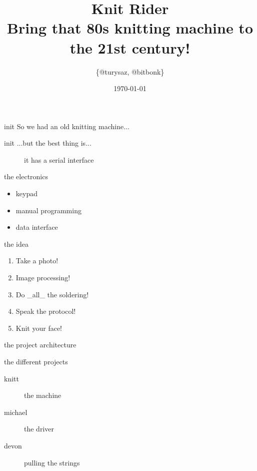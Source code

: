\documentclass{beamer}
\author{\{@turysaz, @bitbonk\}}
\title{\Huge{Knit Rider}\\
    \large{Bring that 80s knitting machine to the 21st century!}
}
\date{\today{}}
\begin{document}
\maketitle

\begin{frame}{init}
      So we had an old knitting machine...
\end{frame}


\begin{frame}{init}
    ...but the best thing is...\pause
    \begin{figure}
        \caption{it has a serial interface}
    \end{figure}
\end{frame}

\begin{frame}{the electronics}
    \begin{itemize}
        \item keypad
        \item manual programming
        \item data interface
    \end{itemize}
\end{frame}

\begin{frame}{the idea}
    \begin{enumerate}[<+->]
        \item Take a photo!
        \item Image processing!
        \item Do \_all\_ the soldering!
        \item Speak the protocol!
        \item Knit your face!
    \end{enumerate}
\end{frame}

\begin{frame}{the project architecture}
    \begin{figure}
    \end{figure}
\end{frame}

\begin{frame}{the different projects}
    \begin{description}
        \item [knitt] the machine
        \item [michael] the driver
        \item [devon] pulling the strings
    \end{description}
\end{frame}
\end{document}
